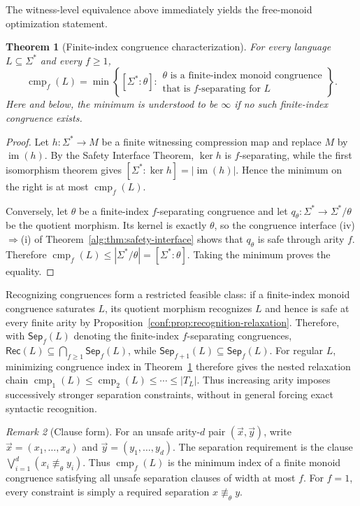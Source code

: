 \documentclass[10pt,a4paper]{article}
\newtheorem{theorem}{Theorem}[section]
\theoremstyle{definition}
\theoremstyle{remark}
\newtheorem{remark}[theorem]{Remark}
\newcommand{\cmp}{\operatorname{cmp}}
\begin{document}
The witness-level equivalence above immediately yields the free-monoid
optimization statement.

\begin{theorem}[Finite-index congruence characterization]
\label{alg:thm:free-congruence}
For every language \(L\subseteq\Sigma^*\) and every \(f\ge1\),
\[
\cmp_f(L)
=
\min\left\{
[\Sigma^*:\theta]:
\begin{array}{l}
\theta\text{ is a finite-index monoid congruence}\\
\text{that is \(f\)-separating for }L
\end{array}
\right\}.
\]
Here and below, the minimum is understood to be \(\infty\) if no such finite-index
congruence exists.
\end{theorem}

\begin{proof}
Let \(h:\Sigma^*\to M\) be a finite witnessing compression map and replace
\(M\) by \(\operatorname{im}(h)\).  By the Safety Interface Theorem,
\(\ker h\) is \(f\)-separating, while the first isomorphism theorem gives
\([\Sigma^*:\ker h]=|\operatorname{im}(h)|.\)
Hence the minimum on the right is at most \(\cmp_f(L)\).

Conversely, let \(\theta\) be a finite-index \(f\)-separating congruence and
let \(q_\theta:\Sigma^*\to\Sigma^*/\theta\) be the quotient morphism.  Its
kernel is exactly \(\theta\), so the congruence interface
\textup{(iv)}\(\Rightarrow\)\textup{(i)} of
Theorem~\ref{alg:thm:safety-interface} shows that \(q_\theta\) is safe through
arity \(f\).  Therefore
\(\cmp_f(L)\le |\Sigma^*/\theta|=[\Sigma^*:\theta].\)
Taking the minimum proves the equality.
\end{proof}

Recognizing congruences form a restricted feasible class: if a finite-index
monoid congruence saturates \(L\), its quotient morphism recognizes \(L\) and
hence is safe at every finite arity by
Proposition~\ref{conf:prop:recognition-relaxation}.  Therefore, with
\(\mathsf{Sep}_f(L)\) denoting the finite-index \(f\)-separating congruences,
\(\mathsf{Rec}(L)\subseteq\bigcap_{f\ge1}\mathsf{Sep}_f(L)\), while
\(\mathsf{Sep}_{f+1}(L)\subseteq\mathsf{Sep}_f(L)\).
For regular \(L\), minimizing congruence index in
Theorem~\ref{alg:thm:free-congruence} therefore gives the nested relaxation
chain
\(\cmp_1(L)\le\cmp_2(L)\le\cdots\le |T_L|.\)
Thus increasing arity imposes successively stronger separation constraints,
without in general forcing exact syntactic recognition.

\begin{remark}[Clause form]
For an unsafe arity-\(d\) pair \((\vec x,\vec y)\), write
\(\vec x=(x_1,\ldots,x_d)\) and \(\vec y=(y_1,\ldots,y_d)\).  The separation
requirement is the clause
\(\bigvee_{i=1}^d(x_i\not\equiv_\theta y_i)\).
Thus \(\cmp_f(L)\) is the minimum index of a finite monoid congruence
satisfying all unsafe separation clauses of width at most \(f\).
For \(f=1\), every constraint is simply a required separation
\(x\not\equiv_\theta y\).
\end{remark}
\end{document}
